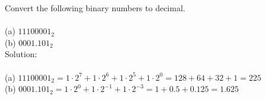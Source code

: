 Convert the following binary numbers to decimal. \\
\\
(a) $11100001_2$ \\
(b) $0001.101_2$ \\

Solution: \\
\\
(a) $11100001_2 = 1 \cdot 2^7 + 1 \cdot 2^6 + 1 \cdot 2^5 + 1 \cdot 2^0 = 128 + 64 + 32 + 1 = 225$ \\
(b) $0001.101_2 = 1 \cdot 2^0 + 1 \cdot 2^{-1} + 1 \cdot 2^{-3} = 1 + 0.5 + 0.125 = 1.625$ \\
